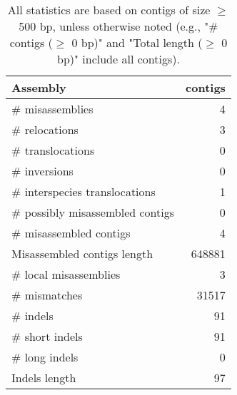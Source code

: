 \documentclass[12pt,a4paper]{article}
\begin{document}
\begin{table}[ht]
\begin{center}
\caption{All statistics are based on contigs of size $\geq$ 500 bp, unless otherwise noted (e.g., "\# contigs ($\geq$ 0 bp)" and "Total length ($\geq$ 0 bp)" include all contigs).}
\begin{tabular}{|l*{1}{|r}|}
\hline
Assembly & contigs \\ \hline
\# misassemblies & 4 \\ \hline
\hspace{5mm}\# relocations & 3 \\ \hline
\hspace{5mm}\# translocations & 0 \\ \hline
\hspace{5mm}\# inversions & 0 \\ \hline
\hspace{5mm}\# interspecies translocations & 1 \\ \hline
\# possibly misassembled contigs & 0 \\ \hline
\# misassembled contigs & 4 \\ \hline
Misassembled contigs length & 648881 \\ \hline
\# local misassemblies & 3 \\ \hline
\# mismatches & 31517 \\ \hline
\# indels & 91 \\ \hline
\hspace{5mm}\# short indels & 91 \\ \hline
\hspace{5mm}\# long indels & 0 \\ \hline
Indels length & 97 \\ \hline
\end{tabular}
\end{center}
\end{table}
\end{document}
